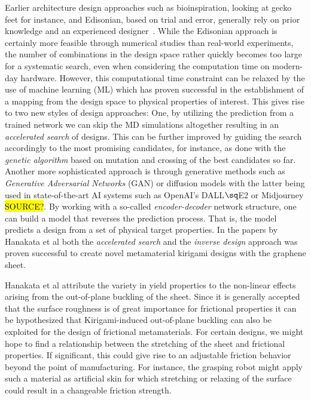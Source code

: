 Earlier architecture design approaches such as bioinspiration, looking at gecko
feet for instance, and Edisonian, based on trial and error, generally rely on
prior knowledge and an experienced designer~\cite{Mao}. While the Edisonian
approach is certainly more feasible through numerical studies than real-world
experiments, the number of combinations in the design space rather quickly
becomes too large for a systematic search, even when considering the computation
time on modern-day hardware. However, this computational time constraint can be
relaxed by the use of machine learning (\acrshort{ML}) which has proven
successful in the establishment of a mapping from the design space to physical
properties of interest. This gives rise to two new styles of design approaches:
One, by utilizing the prediction from a trained network we can skip the
\acrshort{MD} simulations altogether resulting in an \textit{accelerated search}
of designs. This can be further improved by guiding the search accordingly to
the most promising candidates, for instance, as done with the \textit{genetic
algorithm} based on mutation and crossing of the best candidates so far. Another
more sophisticated approach is through generative methods such as
\textit{Generative Adversarial Networks} (GAN) or diffusion models with the
latter being used in state-of-the-art AI systems such as OpenAI's DALL$\sq$E2 or
Midjourney \hl{SOURCE?}. By working with a so-called \textit{encoder-decoder}
network structure, one can build a model that reverses the prediction process.
That is, the model predicts a design from a set of physical target properties.
In the papers by Hanakata et al both the \textit{accelerated search} and the
\textit{inverse design} approach was proven successful to create novel
metamaterial kirigami designs with the graphene sheet. 

Hanakata et al attribute the variety in yield properties to the non-linear
effects arising from the out-of-plane buckling of the sheet. Since it is
generally accepted that the surface roughness is of great importance for
frictional properties it can be hypothesized that Kirigami-induced out-of-plane buckling can also be exploited for the design of frictional metamaterials. For
certain designs, we might hope to find a relationship between the stretching of the
sheet and frictional properties. If significant, this could give rise to an adjustable friction behavior beyond the point of manufacturing. For
instance, the grasping robot might apply such a material as artificial skin for
which stretching or relaxing of the surface could result in a changeable friction strength.

